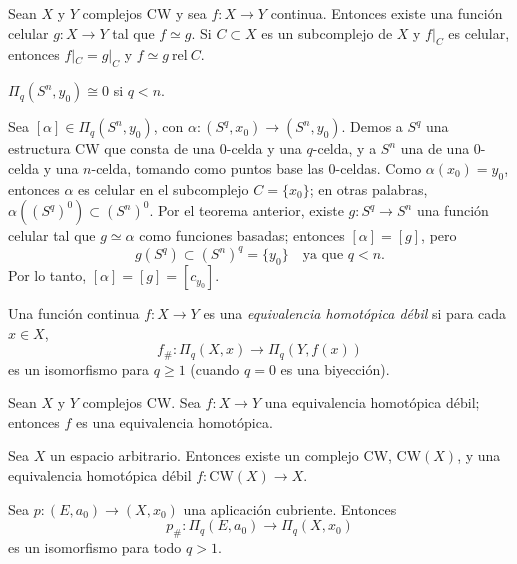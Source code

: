 \begin{teorema}
Sean $X$ y $Y$ complejos CW y sea $f \colon X \to Y$ continua. Entonces existe una función celular $g \colon X \to Y$ tal que $f \simeq g$. Si $C \subset X$ es un subcomplejo de $X$ y $f|_C$ es celular, entonces $f|_C = g|_C$ y $f \simeq g \mathrm{\ rel\ } C$.
\end{teorema}

\begin{prop}
$\Pi_q(S^n, y_0) \cong 0$ si $q < n$.
\end{prop}

\begin{dem}
Sea $[\alpha] \in \Pi_q(S^n, y_0)$, con $\alpha \colon (S^q, x_0) \to (S^n, y_0)$. Demos a $S^q$ una estructura CW que consta de una $0$-celda y una $q$-celda, y a $S^n$ una de una $0$-celda y una $n$-celda, tomando como puntos base las $0$-celdas. Como $\alpha(x_0) = y_0$, entonces $\alpha$ es celular en el subcomplejo $C = \{x_0\}$; en otras palabras, $\alpha((S^q)^0) \subset (S^n)^0$. Por el teorema anterior, existe $g \colon S^q \to S^n$ una función celular tal que $g \simeq \alpha$ como funciones basadas; entonces $[\alpha] = [g]$, pero
\[
g(S^q) \subset (S^n)^q = \{y_0\} \quad \text{ya que } q < n.
\]
Por lo tanto, $[\alpha] = [g] = [c_{y_0}]$.
\end{dem}

\begin{definicion}
Una función continua $f \colon X \to Y$ es una \textit{equivalencia homotópica débil} si para cada $x \in X$,
\[
f_{\#} \colon \Pi_q(X, x) \longrightarrow \Pi_q(Y, f(x))
\]
es un isomorfismo para $q \geq 1$ (cuando $q = 0$ es una biyección).
\end{definicion}

\begin{teorema}[Whitehead]
Sean $X$ y $Y$ complejos CW. Sea $f \colon X \to Y$ una equivalencia homotópica débil; entonces $f$ es una equivalencia homotópica.
\end{teorema}

\begin{teorema}
Sea $X$ un espacio arbitrario. Entonces existe un complejo CW, $\mathrm{CW}(X)$, y una equivalencia homotópica débil $f \colon \mathrm{CW}(X) \to X$.
\end{teorema}

\begin{prop}
\label{prop: Pi_q(E) cong Pi_q(X)}
Sea $p \colon (E, a_0) \to (X, x_0)$ una aplicación cubriente. Entonces
\[
p_{\#} \colon \Pi_q(E, a_0) \longrightarrow \Pi_q(X, x_0)
\]
es un isomorfismo para todo $q > 1$.
\end{prop}

